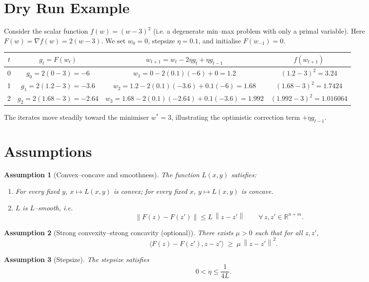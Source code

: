 \documentclass{article}
\newtheorem{assumption}{Assumption}
\newcommand{\grad}{\nabla}
\newcommand{\R}{\mathbb{R}}
\newcommand{\norm}[1]{\left\|#1\right\|}
\newcommand{\inner}[2]{\langle #1,#2\rangle}
\begin{document}
\section*{Dry Run Example}
Consider the scalar function $f(w)=(w-3)^{2}$ (i.e. a degenerate min–max problem with only a primal variable).  
Here $F(w) = \grad f(w)=2(w-3)$.  
We set $w_{0}=0$, stepsize $\eta=0.1$, and initialise $F(w_{-1})=0$.

\begin{center}
\begin{tabular}{c|c|c|c}
$t$ & $g_{t}=F(w_{t})$ & $w_{t+1}=w_{t}-2\eta g_{t}+\eta g_{t-1}$ & $f(w_{t+1})$\\ \hline
0 & $g_{0}=2(0-3)=-6$ & $w_{1}=0-2(0.1)(-6)+0=1.2$ & $(1.2-3)^{2}=3.24$\\[2mm]
1 & $g_{1}=2(1.2-3)=-3.6$ & $w_{2}=1.2-2(0.1)(-3.6)+0.1(-6)=1.68$ & $(1.68-3)^{2}=1.7424$\\[2mm]
2 & $g_{2}=2(1.68-3)=-2.64$ & $w_{3}=1.68-2(0.1)(-2.64)+0.1(-3.6)=1.992$ & $(1.992-3)^{2}=1.016064$\\
\end{tabular}
\end{center}
The iterates move steadily toward the minimiser $w^{*}=3$, illustrating the optimistic correction term $+\eta g_{t-1}$.

\newpage
\section*{Assumptions}
\begin{assumption}[Convex–concave and smoothness]\label{ass:smooth}
The function $L(x,y)$ satisfies:
\begin{enumerate}
\item For every fixed $y$, $x\mapsto L(x,y)$ is convex; for every fixed $x$, $y\mapsto L(x,y)$ is concave.
\item $L$ is $L$–smooth, i.e.
\[
\norm{F(z)-F(z')}\le L\,\norm{z-z'}\qquad\forall\,z,z'\in\R^{n+m}.
\]
\end{enumerate}
\end{assumption}

\begin{assumption}[Strong convexity–strong concavity (optional)]\label{ass:strong}
There exists $\mu>0$ such that for all $z,z'$,
\[
\inner{F(z)-F(z')}{z-z'}\;\ge\;\mu\,\norm{z-z'}^{2}.
\]
\end{assumption}

\begin{assumption}[Stepsize]\label{ass:step}
The stepsize satisfies 
\[
0<\eta\le \frac{1}{4L}.
\]
\end{assumption}
\end{document}
